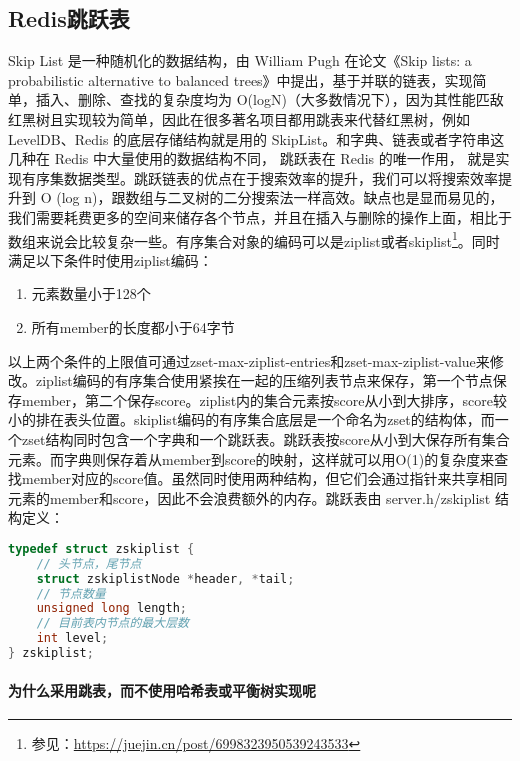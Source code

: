 \documentclass[../../../interview-questions.tex]{subfiles}
\begin{document}
\subsection{Redis跳跃表}

Skip List 是一种随机化的数据结构，由 William Pugh 在论文《Skip lists: a probabilistic alternative to balanced trees》中提出，基于并联的链表，实现简单，插入、删除、查找的复杂度均为 O(logN)（大多数情况下），因为其性能匹敌红黑树且实现较为简单，因此在很多著名项目都用跳表来代替红黑树，例如 LevelDB、Redis 的底层存储结构就是用的 SkipList。和字典、链表或者字符串这几种在 Redis 中大量使用的数据结构不同， 跳跃表在 Redis 的唯一作用， 就是实现有序集数据类型。跳跃链表的优点在于搜索效率的提升，我们可以将搜索效率提升到 O (log n)，跟数组与二叉树的二分搜索法一样高效。缺点也是显而易见的，我们需要耗费更多的空间来储存各个节点，并且在插入与删除的操作上面，相比于数组来说会比较复杂一些。有序集合对象的编码可以是ziplist或者skiplist\footnote{参见：\url{https://juejin.cn/post/6998323950539243533}}。同时满足以下条件时使用ziplist编码：

\begin{enumerate}
    \item {元素数量小于128个}
    \item {所有member的长度都小于64字节}
\end{enumerate}

以上两个条件的上限值可通过zset-max-ziplist-entries和zset-max-ziplist-value来修改。ziplist编码的有序集合使用紧挨在一起的压缩列表节点来保存，第一个节点保存member，第二个保存score。ziplist内的集合元素按score从小到大排序，score较小的排在表头位置。skiplist编码的有序集合底层是一个命名为zset的结构体，而一个zset结构同时包含一个字典和一个跳跃表。跳跃表按score从小到大保存所有集合元素。而字典则保存着从member到score的映射，这样就可以用O(1)的复杂度来查找member对应的score值。虽然同时使用两种结构，但它们会通过指针来共享相同元素的member和score，因此不会浪费额外的内存。跳跃表由 server.h/zskiplist 结构定义：

\begin{lstlisting}[language=C]
typedef struct zskiplist {
    // 头节点，尾节点
    struct zskiplistNode *header, *tail;
    // 节点数量
    unsigned long length;
    // 目前表内节点的最大层数
    int level;
} zskiplist;    
\end{lstlisting}


\paragraph{为什么采用跳表，而不使用哈希表或平衡树实现呢}
\end{document}
